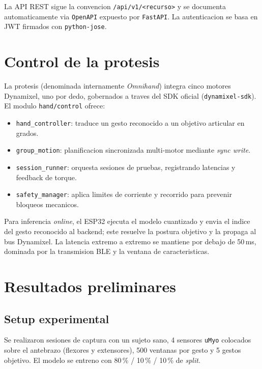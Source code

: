 \documentclass[11pt,a4paper]{article}
\begin{document}
La API REST sigue la convencion \texttt{/api/v1/<recurso>} y se
documenta automaticamente via \texttt{OpenAPI} expuesto por
\texttt{FastAPI}. La autenticacion se basa en JWT firmados con
\texttt{python-jose}.

\section{Control de la protesis}
\label{sec:control}

La protesis (denominada internamente \emph{Omnihand}) integra cinco
motores Dynamixel, uno por dedo, gobernados a traves del SDK oficial
(\texttt{dynamixel-sdk}). El modulo \texttt{hand/control} ofrece:

\begin{itemize}
  \item \texttt{hand\_controller}: traduce un gesto reconocido a un
        objetivo articular en grados.
  \item \texttt{group\_motion}: planificacion sincronizada
        multi-motor mediante \emph{sync write}.
  \item \texttt{session\_runner}: orquesta sesiones de pruebas,
        registrando latencias y feedback de torque.
  \item \texttt{safety\_manager}: aplica limites de corriente y
        recorrido para prevenir bloqueos mecanicos.
\end{itemize}

Para inferencia \emph{online}, el ESP32 ejecuta el modelo cuantizado y
envia el indice del gesto reconocido al backend; este resuelve la
postura objetivo y la propaga al bus Dynamixel. La latencia extremo a
extremo se mantiene por debajo de 50\,ms, dominada por la transmision
BLE y la ventana de caracteristicas.

\section{Resultados preliminares}
\label{sec:results}

\subsection{Setup experimental}
Se realizaron sesiones de captura con un sujeto sano, 4 sensores
\texttt{uMyo} colocados sobre el antebrazo (flexores y extensores),
500 ventanas por gesto y 5 gestos objetivo. El modelo se entreno con
80\,\% / 10\,\% / 10\,\% de \emph{split}.
\end{document}
